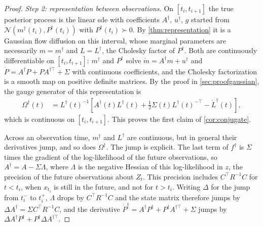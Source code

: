 \documentclass{article} %
\newcommand{\postdrift}{f}
\newcommand{\vol}{g}
\newcommand{\gauge}{\Omega}
\newcommand{\Norm}{\mathcal{N}}
\begin{document}
\begin{proof}
\emph{Step 2: representation between observations.} On $[t_i, t_{i+1}]$ the true posterior process is the linear \gls{sde} with coefficients $A^\dagger$, $u^\dagger$, $\vol$ started from $\Norm(m^\dagger(t_i), P^\dagger(t_i))$ with $P^\dagger(t_i) \succ 0$. By \cref{thm:representation} it is a Gaussian flow diffusion on this interval, whose marginal parameters are necessarily $m = m^\dagger$ and $L = L^\dagger$, the Cholesky factor of $P^\dagger$. Both are continuously differentiable on $[t_i, t_{i+1}]$: $m^\dagger$ and $P^\dagger$ solve $\dot m = A^\dagger m + u^\dagger$ and $\dot P = A^\dagger P + P A^{\dagger\top} + \Sigma$ with continuous coefficients, and the Cholesky factorization is a smooth map on positive definite matrices. By the proof in \cref{sec:proofgaussian}, the gauge generator of this representation is
\begin{align*}
    \gauge^\dagger(t) &= L^\dagger(t)^{-1} \left[ A^\dagger(t) L^\dagger(t) + \frac{1}{2} \Sigma(t) L^\dagger(t)^{-\top} - \dot L^\dagger(t) \right],
\end{align*}
which is continuous on $[t_i, t_{i+1}]$. This proves the first claim of \cref{cor:conjugate}.

Across an observation time, $m^\dagger$ and $L^\dagger$ are continuous, but in general their derivatives jump, and so does $\gauge^\dagger$. The jump is explicit. The last term of $\postdrift^\dagger$ is $\Sigma$ times the gradient of the log-likelihood of the future observations, so $A^\dagger = A - \Sigma \Lambda$, where $\Lambda$ is the negative Hessian of this log-likelihood in $z$, the precision of the future observations about $Z_t$. This precision includes $C^\top R^{-1} C$ for $t < t_i$, when $x_{t_i}$ is still in the future, and not for $t > t_i$. Writing $\Delta$ for the jump from $t_i^-$ to $t_i^+$, $\Lambda$ drops by $C^\top R^{-1} C$ and the state matrix therefore jumps by $\Delta A^\dagger = \Sigma C^\top R^{-1} C$, and the derivative $\dot P^\dagger = A^\dagger P^\dagger + P^\dagger A^{\dagger\top} + \Sigma$ jumps by $\Delta A^\dagger P^\dagger + P^\dagger \Delta A^{\dagger\top}$.


\end{proof}
\end{document}
